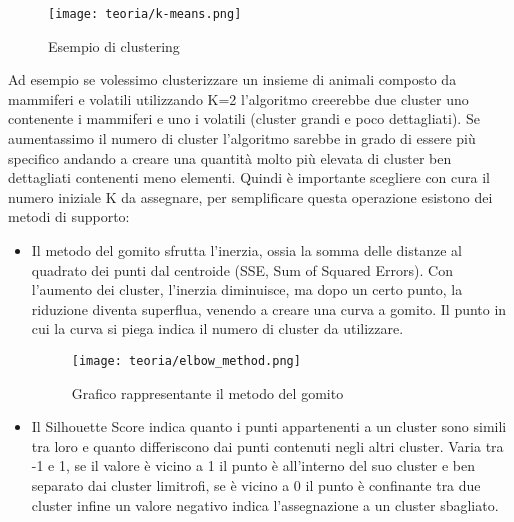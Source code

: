 \begin{figure}[!h] 
    \centering 
    \texttt{[image: teoria/k-means.png]} 
    \caption{Esempio di clustering}
    \label{fig:k-means}
  \end{figure}
Ad esempio se volessimo clusterizzare un insieme di animali composto da mammiferi e volatili utilizzando K=2 l'algoritmo creerebbe due cluster uno contenente i mammiferi e uno i volatili  (cluster grandi e poco dettagliati).
Se aumentassimo il numero di cluster l'algoritmo sarebbe in grado di essere più specifico andando a creare una quantità molto più elevata di cluster ben dettagliati contenenti meno elementi.
Quindi è importante scegliere con cura il numero iniziale K da assegnare, per semplificare questa operazione esistono dei metodi di supporto:
\begin{itemize}
    \item Il metodo del gomito sfrutta l’inerzia, ossia la somma delle distanze al quadrato dei punti dal centroide (SSE, Sum of Squared Errors). Con l'aumento dei cluster, l’inerzia diminuisce, ma dopo un certo punto, la riduzione diventa superflua, venendo a creare una curva a gomito. Il punto in cui la curva si piega indica il numero di cluster da utilizzare.
    
    \begin{figure}[!h] 
        \centering 
        \texttt{[image: teoria/elbow\_method.png]} 
        \caption{Grafico rappresentante il metodo del gomito}
        \label{fig:gomito}
      \end{figure}
    \newpage
    \item Il Silhouette Score indica quanto i punti appartenenti a un cluster sono simili tra loro e quanto differiscono dai punti contenuti negli altri cluster.
    Varia tra -1 e 1, se il valore è vicino a 1 il punto è all'interno del suo cluster e ben separato dai cluster limitrofi, se è vicino a 0 il punto è confinante tra due cluster infine un valore negativo indica l'assegnazione a un cluster sbagliato.
\end{itemize}

